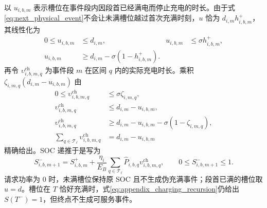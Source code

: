 \documentclass[12pt,a4paper,UTF8]{ctexart}
\begin{document}
以 $u_{i,b,m}$ 表示槽位在事件段内因段首已经满电而停止充电的时长。由于式\eqref{eq:next_physical_event}不会让未满槽位越过首次充满时刻，$u$ 恰为
$d_{i,m}h_{i,b,m}^{+}$，其线性化为
\begin{subequations}
\label{eq:full_stop_indicator}
\begin{align}
0\le u_{i,b,m}&\le d_{i,m},&
u_{i,b,m}&\le\sigma h_{i,b,m}^{+},\\
u_{i,b,m}&\ge d_{i,m}
-\sigma(1-h_{i,b,m}^{+}).
\end{align}
\end{subequations}
再令 $\upsilon_{i,b,m,q}^{\mathrm{ch}}$ 为事件段 $m$ 在区间 $q$ 内的实际充电时长。乘积
$\zeta_{i,m,q}(d_{i,m}-u_{i,b,m})$ 由
\begin{subequations}
\label{eq:interval_charging_duration}
\begin{align}
0\le\upsilon_{i,b,m,q}^{\mathrm{ch}}
&\le\sigma\zeta_{i,m,q},\\
\upsilon_{i,b,m,q}^{\mathrm{ch}}
&\le d_{i,m}-u_{i,b,m},\\
\upsilon_{i,b,m,q}^{\mathrm{ch}}
&\ge d_{i,m}-u_{i,b,m}
-\sigma(1-\zeta_{i,m,q}),\\
\sum_{q\in\mathcal T_\ell}
\upsilon_{i,b,m,q}^{\mathrm{ch}}
&=d_{i,m}-u_{i,b,m}
\end{align}
\end{subequations}
精确给出。SOC 递推于是写为
\begin{equation}
S_{i,b,m+1}^{-}
=S_{i,b,m}^{+}
+\frac{\eta_i}{E_B}
\sum_{q\in\mathcal T_\ell}
\widehat P_{i,b,q}
\upsilon_{i,b,m,q}^{\mathrm{ch}},
\qquad 0\le S_{i,b,m+1}^{-}\le1.
\label{eq:appendix_charging_recursion}
\end{equation}
请求功率为 $0$ 时，未满槽位保持原 SOC 且不生成伪充满事件；段首已满的槽位取 $u=d$。槽位在 $T$ 恰好充满时，式\eqref{eq:appendix_charging_recursion}仍给出 $S(T^-)=1$，但终点不生成可服务事件。
\end{document}

